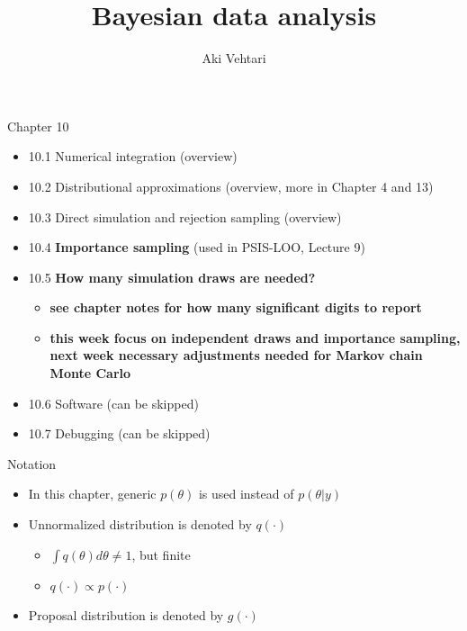 \documentclass[english,t]{beamer}
\title[]{Bayesian data analysis}
\subtitle{}
\author{Aki Vehtari}
\institute[Aalto]{}
\begin{document}
\begin{frame}{Chapter 10}

  \begin{itemize}
\item 10.1 Numerical integration (overview)
\item 10.2 Distributional approximations (overview, more in Chapter 4 and 13)
\item 10.3 Direct simulation and rejection sampling (overview)
\item 10.4 \textbf{Importance sampling} (used in PSIS-LOO, Lecture 9)
\item 10.5 \textbf{How many simulation draws are needed?} 
  \begin{itemize}
  \item \textbf{see chapter notes for how many significant digits to report}
  \item \textbf{this week focus on independent draws and importance sampling,
    next week necessary adjustments needed for Markov chain Monte
    Carlo}
  \end{itemize}
\item 10.6 Software (can be skipped)
\item 10.7 Debugging (can be skipped)
   \end{itemize}
\end{frame}

\begin{frame}{Notation}

  \begin{itemize}
  \item In this chapter, generic $p(\theta)$ is used instead of
    $p(\theta|y)$
  \item Unnormalized distribution is denoted by $q(\cdot)$
    \begin{itemize}
    \item $\int q(\theta) d\theta \neq 1$, but finite
    \item $q(\cdot) \propto p(\cdot)$
    \end{itemize}
  \item Proposal distribution is denoted by $g(\cdot)$
  \end{itemize}

\end{frame}
\end{document}
